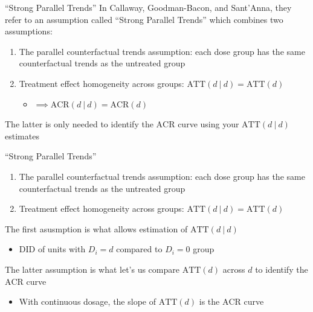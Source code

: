 \documentclass[aspectratio=169,t]{beamer}
\begin{document}
\begin{frame}{``Strong Parallel Trends''}
  In Callaway, Goodman-Bacon, and Sant'Anna, they refer to an assumption called ``Strong Parallel Trends'' which combines two assumptions:
  \begin{enumerate}
    \item The parallel counterfactual trends assumption: each dose group has the same counterfactual trends as the untreated group
    
    \item Treatment effect homogeneity across groups: $\text{ATT}(d \ | \ d) = \text{ATT}(d)$
    \begin{itemize}
      \item $\implies \text{ACR}(d \ | \ d) = \text{ACR}(d)$
    \end{itemize}
  \end{enumerate}

  The latter is only needed to identify the $\text{ACR}$ curve using your $\text{ATT}(d \ | \ d)$ estimates
\end{frame}

\begin{frame}{``Strong Parallel Trends''}
  \begin{enumerate}
    \item The parallel counterfactual trends assumption: each dose group has the same counterfactual trends as the untreated group
    
    \item Treatment effect homogeneity across groups: $\text{ATT}(d \ | \ d) = \text{ATT}(d)$
  \end{enumerate}

  \bigskip
  The first asusmption is what allows estimation of $\text{ATT}(d \ | \ d)$ 
  \begin{itemize}
    \item DID of units with $D_i = d$ compared to $D_i = 0$ group 
    
  \end{itemize}
 
  \pause
  \bigskip
  The latter assumption is what let's us compare $\text{ATT}(d)$ across $d$ to identify the $\text{ACR}$ curve
  \begin{itemize}
    \item With continuous dosage, the slope of $\text{ATT}(d)$ is the $\text{ACR}$ curve
  \end{itemize}
\end{frame}
\end{document}
